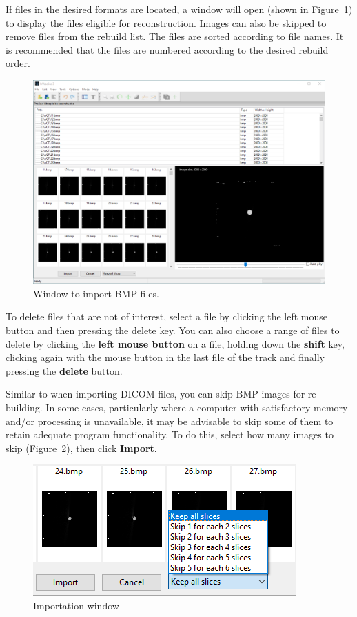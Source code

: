 If files in the desired formats are located, a window will open (shown in Figure~\ref{fig:import_bmp_window_pt}) to display the files eligible for reconstruction. Images can also be skipped to remove files from the rebuild list. The files are sorted according to file names. It is recommended that the files are numbered according to the desired rebuild order.

\begin{figure}[!htb]
\centering
\includegraphics[scale=0.3]{../user_guide_figures/invesalius_screen/import_bmp_window_en.png}
\caption{Window to import BMP files.}
\label{fig:import_bmp_window_pt}
\end{figure}
 
To delete files that are not of interest, select a file by clicking the left mouse button and then pressing the delete key. You can also choose a
range of files to delete by clicking the \textbf{left mouse button} on a file, holding down the \textbf{shift} key, clicking again with the mouse button in the last file of the track and finally pressing the \textbf{delete} button.

Similar to when importing DICOM files, you can skip BMP images for re-building. In some cases, particularly where a computer with satisfactory memory and/or processing is unavailable, it may be advisable to skip some of them to retain adequate program functionality. To do this, select how many images to skip (Figure~\ref{fig:import_bmp_skip_pt}), then click \textbf{Import}.

\begin{figure}[!htb]
\centering
\includegraphics[scale=0.4]{../user_guide_figures/invesalius_screen/import_bmp_skip_en.png}
\caption{Importation window}
\label{fig:import_bmp_skip_pt}
\end{figure}

